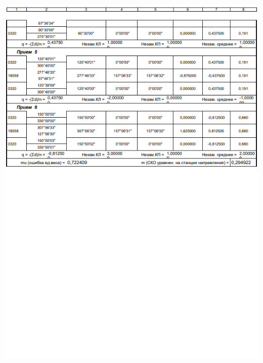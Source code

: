 \documentclass[a4paper]{article}
\begin{document}
\begin{newpage}
\begin{center}
        \includegraphics[scale=1.4]{vedomosty/скп13.png}
    \end{center}

\end{newpage}
\end{document}
